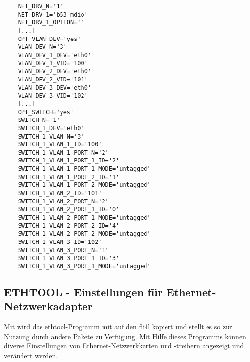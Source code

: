 \begin{example}
\begin{verbatim}
    NET_DRV_N='1'
    NET_DRV_1='b53_mdio'
    NET_DRV_1_OPTION=''
    [...]
    OPT_VLAN_DEV='yes'
    VLAN_DEV_N='3'
    VLAN_DEV_1_DEV='eth0'
    VLAN_DEV_1_VID='100'
    VLAN_DEV_2_DEV='eth0'
    VLAN_DEV_2_VID='101'
    VLAN_DEV_3_DEV='eth0'
    VLAN_DEV_3_VID='102'
    [...]
    OPT_SWITCH='yes'
    SWITCH_N='1'
    SWITCH_1_DEV='eth0'
    SWITCH_1_VLAN_N='3'
    SWITCH_1_VLAN_1_ID='100'
    SWITCH_1_VLAN_1_PORT_N='2'
    SWITCH_1_VLAN_1_PORT_1_ID='2'
    SWITCH_1_VLAN_1_PORT_1_MODE='untagged'
    SWITCH_1_VLAN_1_PORT_2_ID='1'
    SWITCH_1_VLAN_1_PORT_2_MODE='untagged'
    SWITCH_1_VLAN_2_ID='101'
    SWITCH_1_VLAN_2_PORT_N='2'
    SWITCH_1_VLAN_2_PORT_1_ID='0'
    SWITCH_1_VLAN_2_PORT_1_MODE='untagged'
    SWITCH_1_VLAN_2_PORT_2_ID='4'
    SWITCH_1_VLAN_2_PORT_2_MODE='untagged'
    SWITCH_1_VLAN_3_ID='102'
    SWITCH_1_VLAN_3_PORT_N='1'
    SWITCH_1_VLAN_3_PORT_1_ID='3'
    SWITCH_1_VLAN_3_PORT_1_MODE='untagged'
\end{verbatim}
\end{example}

\subsection{ETHTOOL - Einstellungen für Ethernet-Netzwerkadapter}

Mit  wird das ethtool-Programm mit auf den fli4l 
kopiert und stellt es so zur Nutzung durch andere Pakete zu Verfügung.
Mit Hilfe dieses Programms können diverse Einstellungen von
Ethernet-Netzwerkkarten und -treibern angezeigt und verändert werden.

